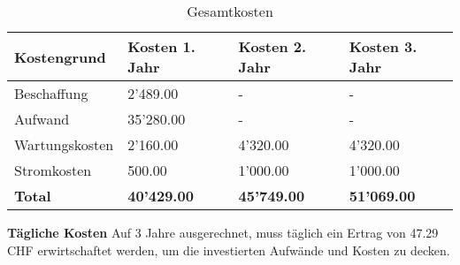 \begin{table}[H]
\centering
\begin{tabular}{p{4cm}p{4cm}p{4cm}p{4cm}}
\hline
\rowcolor{heading} \textbf{Kostengrund} & \textbf{Kosten 1. Jahr} & \textbf{Kosten 2. Jahr} & \textbf{Kosten 3. Jahr}\\\hline
Beschaffung & \hfill 2'489.00 &\hfill - &\hfill - \\\hline
Aufwand & \hfill 35'280.00 & \hfill- & \hfill- \\\hline
Wartungskosten & \hfill 2'160.00 & \hfill 4'320.00 & \hfill 4'320.00 \\\hline
Stromkosten & \hfill 500.00 & \hfill 1'000.00 & \hfill 1'000.00 \\\hline
\rowcolor{subheading}\textbf{Total} & \hfill \textbf{40'429.00} & \hfill \textbf{45'749.00} & \hfill \textbf{51'069.00} \\\hline
\end{tabular}
\caption{Gesamtkosten}
\end{table}

\textbf{Tägliche Kosten}\newline
Auf 3 Jahre ausgerechnet, muss täglich ein Ertrag von 47.29 CHF erwirtschaftet werden, um die investierten Aufwände und Kosten zu decken.

